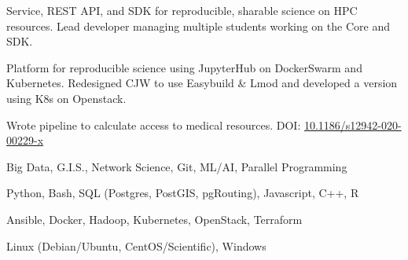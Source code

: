 \documentclass{acmresume}
\begin{document}
        \begin{titemize}
        \end{titemize}

        \begin{titemize}
        \end{titemize}
    
    
    

    \begin{titemize}
        \titem Service, REST API, and SDK for reproducible, sharable science on HPC resources.
        \titem Lead developer managing multiple students working on the Core and SDK.
    \end{titemize}

    \begin{titemize}
    	\titem Platform for reproducible science using JupyterHub on DockerSwarm and Kubernetes.
    	\titem Redesigned CJW to use Easybuild \& Lmod and developed a version using K8s on Openstack.
    \end{titemize}
    
    \begin{titemize}
    	\titem Wrote pipeline to calculate access to medical resources. DOI: \href{https://doi.org/10.1186/s12942-020-00229-x}{10.1186/s12942-020-00229-x}
    \end{titemize}
    
    
    
    

        \begin{description}[topsep=0pt,itemsep=0pt]
        	 Big Data, G.I.S., Network Science, Git, ML/AI, Parallel Programming
        	
        	\desc[Languages:] Python, Bash, SQL (Postgres, PostGIS, pgRouting), Javascript, C++, R
        	
        	\desc[Technologies:] Ansible, Docker, Hadoop, Kubernetes, OpenStack, Terraform
        	
        	 Linux (Debian/Ubuntu, CentOS/Scientific), Windows
        \end{description}

	
\end{document}
